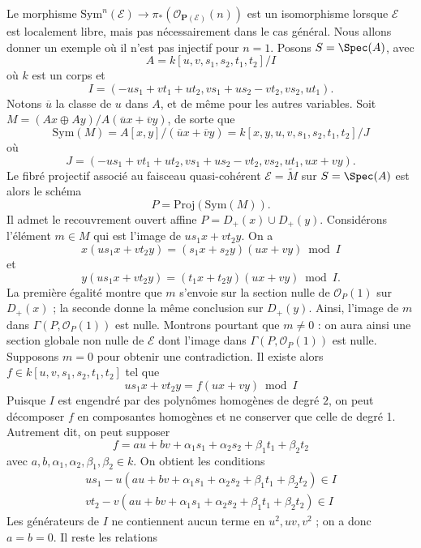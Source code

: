 \begin{example}
\label{example-projective-bundle}
Le morphisme $\text{Sym}^n(\mathcal{E}) \to
\pi_*(\mathcal{O}_{\mathbf{P}(\mathcal{E})}(n))$ est un isomorphisme lorsque
$\mathcal{E}$ est localement libre, mais pas nécessairement dans le cas
général. Nous allons donner un exemple où il n'est pas injectif pour
$n = 1$. Posons $S = \Spec(A)$, avec
$$
A = k[u, v, s_1, s_2, t_1, t_2]/I
$$
où $k$ est un corps et
$$
I = (-us_1 + vt_1 + ut_2, vs_1 + us_2 - vt_2, vs_2, ut_1).
$$
Notons $\overline{u}$ la classe de $u$ dans $A$, et de même pour les autres
variables. Soit $M = (Ax \oplus Ay)/A(\overline{u}x + \overline{v}y)$,
de sorte que
$$
\text{Sym}(M) = A[x, y]/(\overline{u}x + \overline{v}y)
= k[x, y, u, v, s_1, s_2, t_1, t_2]/J
$$
où
$$
J = (-us_1 + vt_1 + ut_2, vs_1 + us_2 - vt_2, vs_2, ut_1, ux + vy).
$$
Le fibré projectif associé au faisceau quasi-cohérent
$\mathcal{E} = \widetilde{M}$ sur $S = \Spec(A)$ est alors le schéma
$$
P =
\text{Proj}(\text{Sym}(M)).
$$
Il admet le recouvrement ouvert affine $P = D_{+}(x) \cup D_{+}(y)$.
Considérons l'élément $m \in M$ qui est l'image de $us_1x + vt_2y$.
On a
$$
x(us_1x + vt_2y) = (s_1x + s_2y)(ux + vy) \bmod I
$$
et
$$
y(us_1x + vt_2y) = (t_1x + t_2y)(ux + vy) \bmod I.
$$
La première égalité montre que $m$ s'envoie sur la section nulle de
$\mathcal{O}_P(1)$ sur $D_{+}(x)$ ; la seconde donne la même conclusion
sur $D_{+}(y)$. Ainsi, l'image de $m$ dans
$\Gamma(P, \mathcal{O}_P(1))$ est nulle.
Montrons pourtant que $m \not = 0$ : on aura ainsi une section globale
non nulle de $\mathcal{E}$ dont l'image dans
$\Gamma(P, \mathcal{O}_P(1))$ est nulle. Supposons $m = 0$ pour obtenir
une contradiction. Il existe alors
$f \in k[u, v, s_1, s_2, t_1, t_2]$ tel que
$$
us_1x + vt_2y = f(ux + vy) \bmod I
$$
Puisque $I$ est engendré par des polynômes homogènes de degré $2$, on peut
décomposer $f$ en composantes homogènes et ne conserver que celle de degré
1. Autrement dit, on peut supposer
$$
f = au + bv + \alpha_1s_1 + \alpha_2s_2 + \beta_1t_1 + \beta_2t_2
$$
avec $a, b, \alpha_1, \alpha_2, \beta_1, \beta_2 \in k$.
On obtient les conditions
$$
\begin{matrix}
us_1 - u(au + bv + \alpha_1s_1 + \alpha_2s_2 + \beta_1t_1 + \beta_2t_2)
\in I \\
vt_2 - v(au + bv + \alpha_1s_1 + \alpha_2s_2 + \beta_1t_1 + \beta_2t_2)
\in I
\end{matrix}
$$
Les générateurs de $I$ ne contiennent aucun terme en $u^2, uv, v^2$ ;
on a donc $a = b = 0$. Il reste les relations
$$
\begin{matrix}

\end{matrix}$$
\end{example}
